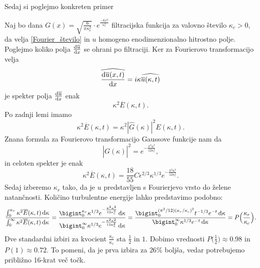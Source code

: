 \documentclass[mat2, tisk]{fmfdelo}
\begin{document}
Sedaj si poglejmo konkreten primer 
\begin{primer}
Naj bo dana $G(x) = \sqrt{\frac{6}{\pi \kappa_c^2}}\cdot e^\frac{-6x^2}{\kappa_c^2}$ filtracijska funkcija 
za valovno število $\kappa_c > 0$, da velja \eqref{Fourier_število} in $u$ homogeno enodimenzionalno hitrostno polje. Poglejmo koliko polja $\frac{\dif \overline{u}}{\dif x}$
se ohrani po filtraciji. Ker za Fourierovo transformacijo velja
$$
\widehat{\frac{\dif \overline{u}(x, t)}{\dif x}} = i\kappa \widehat{\overline{u}(\kappa, t)}
$$
je spekter polja $\frac{\dif \overline{u}}{\dif x}$ enak 
$$
\kappa^2 \overline{E}(\kappa, t).
$$
Po zadnji lemi imamo 
$$
\kappa^2 \overline{E}(\kappa, t) = \kappa^2 |\hat{G}(\kappa)|^2 E(\kappa, t).
$$
Znana formula za Fourierovo transformacijo Gaussove funkcije nam da
$$
|\hat{G}(\kappa)|^2 = e^{-\frac{\pi^2 \kappa^2}{12\kappa_c^2}},
$$
in celoten spekter je enak 
$$
\kappa^2 \overline{E}(\kappa, t) = \frac{18}{55} C\epsilon^{2/3} \kappa^{1/3} e^{-\frac{\pi^2 \kappa^2}{12\kappa_c^2}}.
$$
Sedaj izberemo $\kappa_r$ tako, da je $u$ predstavljen s Fourierjevo vrsto 
do želene natančnosti. Količino turbulentne energije lahko predstavimo podobno:
\begin{align*}
\frac{\int_{0}^{\kappa_r} \kappa^2 \overline{E}(\kappa, t)\dif \kappa}{\int_{0}^{\infty} \kappa^2 \overline{E}(\kappa, t)\dif \kappa} = \frac{\bigint_0^{\kappa_r} \kappa^{1/3} e^{-\frac{\pi^2 \kappa^2}{12\kappa_c^2}}\dif \kappa}{\bigint_{0}^{\infty} \kappa^{1/3} e^{-\frac{\pi^2 \kappa^2}{12\kappa_c^2}}\dif \kappa} = 
\frac{\bigint_0^{(\pi^2/12)(\kappa_r/\kappa_c)^2} t^{-1/3} e^{-t}\dif \kappa}{\bigint_{0}^{\infty} \kappa^{1/3} e^{-t}\dif \kappa} = P\Big(\frac{\kappa_r}{\kappa_c}\Big).
\end{align*}
Dve standardni izbiri za kvocient $\frac{\kappa_r}{\kappa_c}$ sta $\frac{1}{2}$ in $1$.
Dobimo vrednosti $P\Big(\frac{1}{2}\Big) \approx 0.98$ in 
$P(1) \approx 0.72$. To pomeni, da je prva izbira za $26\%$ boljša, 
vedar potrebujemo približno 16-krat več točk.
\end{primer}
\end{document}
